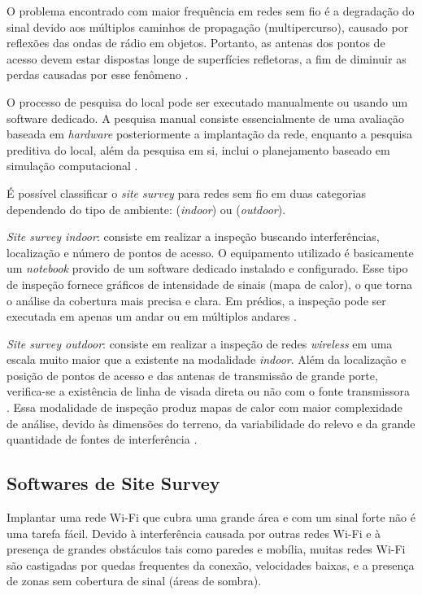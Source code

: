 O problema encontrado com maior frequência em redes sem fio é a degradação do sinal devido aos múltiplos caminhos de propagação (multipercurso), causado por reflexões das ondas de rádio em objetos. Portanto, as antenas dos pontos de acesso devem estar dispostas longe de superfícies refletoras, a fim de diminuir as perdas causadas por esse fenômeno \cite{kar2018ieee}.

O processo de pesquisa do local pode ser executado manualmente ou usando um software dedicado. A pesquisa manual consiste essencialmente de uma avaliação baseada em \textit{hardware} posteriormente a implantação da rede, enquanto a pesquisa preditiva do local, além da pesquisa em si, inclui o planejamento baseado em simulação computacional \cite{kar2018ieee}.

É possível classificar o \textit{site survey} para redes sem fio em duas categorias dependendo do tipo de ambiente: (\textit{indoor}) ou (\textit{outdoor}).

\textit{Site survey indoor}: consiste em realizar a inspeção buscando interferências, localização e número de pontos de acesso. O equipamento utilizado é basicamente um \textit{notebook} provido de um software dedicado instalado e configurado. Esse tipo de inspeção fornece gráficos de intensidade de sinais (mapa de calor), o que torna o análise da cobertura mais precisa e clara. Em prédios, a inspeção pode ser executada em apenas um andar ou em múltiplos andares .

\textit{Site survey outdoor}: consiste em realizar a inspeção de redes \textit{wireless} em uma escala muito maior que a existente na modalidade \textit{indoor}. Além da localização e posição de pontos de acesso e das antenas de transmissão de grande porte, verifica-se a existência de linha de visada direta ou não com o fonte transmissora \cite{pinheiro2004site}. Essa modalidade de inspeção produz mapas de calor com maior complexidade de análise, devido às dimensões do terreno, da variabilidade do relevo e da grande quantidade de fontes de interferência .

\subsection{Softwares de Site Survey}
\label{subsec:softwares-site-survey}

Implantar uma rede Wi-Fi que cubra uma grande área e com um sinal forte não é uma tarefa fácil. Devido à interferência causada por outras redes Wi-Fi e à presença de grandes obstáculos tais como paredes e mobília, muitas redes Wi-Fi são castigadas por quedas frequentes da conexão, velocidades baixas, e a presença de zonas sem cobertura de sinal (áreas de sombra).

